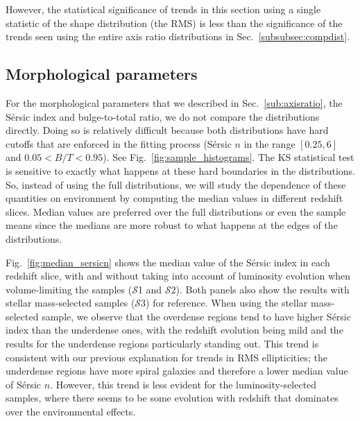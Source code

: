 \documentclass[twocolumn,useAMS,usenatbib]{mn2e}
\newcommand{\rachel}[1]{{\textcolor{red}{#1}}}
\newcommand{\arun}[1]{{\textcolor{blue}{#1}}}
\newcommand{\claire}[1]{{\textcolor{magenta}{#1}}}
\newcommand{\sersic}{S\'{e}rsic }
\newcommand{\s}{\ensuremath{\mathcal{S}}}
\begin{document}
However, the statistical significance of
trends in this section using a single statistic of the shape
distribution (the RMS) is less than the significance of the trends
seen using the entire axis ratio distributions in Sec.~\ref{subsubsec:compdist}.

\subsection{Morphological parameters}

For the morphological parameters that we described in
Sec.~\ref{sub:axisratio}, the \sersic index and bulge-to-total ratio,
we do not compare the distributions directly.  Doing so is relatively
difficult %
because both distributions have hard cutoffs that are enforced
in the fitting process (\sersic $n$ in the range $[0.25, 6]$ and
$0.05<B/T<0.95$). See Fig.~\ref{fig:sample_histograms}.
The KS statistical test is sensitive to exactly what happens at these hard boundaries in the distributions.
So, instead of using the full distributions, we will study the
dependence of these quantities on environment by computing the median
values in different redshift slices.  Median values are preferred
over the full distributions or even the sample means since the medians
are more robust to what happens at the edges of the distributions.

Fig.~\ref{fig:median_sersicn} shows the median value of the \sersic
index in each redshift slice, with and without taking into account of
luminosity evolution when volume-limiting the samples (\s1 and
\s2). Both panels also show the results with stellar mass-selected
samples (\s3) for reference.  
When using the stellar mass-selected sample, we observe that the
overdense regions tend to have higher \sersic 
index than the underdense ones, with the redshift evolution being mild
and the results for the underdense regions particularly standing
out. This trend is consistent with our previous explanation for trends
in RMS ellipticities; the underdense regions have more spiral galaxies
and therefore a lower median value of \sersic $n$. 
However, this trend is less evident for the luminosity-selected
samples, where there seems to be some evolution with redshift that
dominates over the environmental effects.
\end{document}
